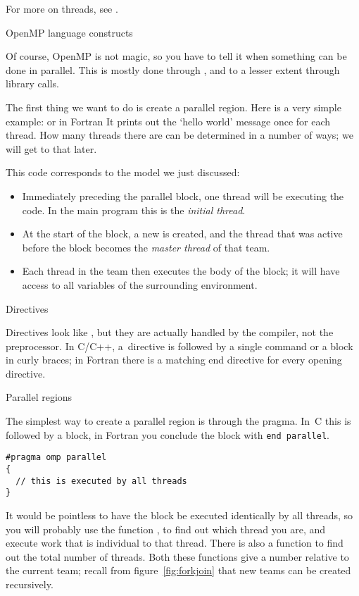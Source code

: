 For more on threads, see .

 {OpenMP language constructs}

Of course, OpenMP is not magic, so you have to tell it when something
can be done in parallel. This is mostly done through ,
and to a lesser extent through library calls.

The first thing we want to do is create a parallel region.
Here is a very simple example:
or in Fortran
It prints out the `hello world' message once for each thread. How many
threads there are can be determined in a number of ways; we will get to that later.

This code corresponds to the model we just discussed:
\begin{itemize}
\item Immediately preceding the parallel block, one thread will be
  executing the code. In the main program this is the \emph{initial
    thread}.
\item At the start of the block, a new  is
  created, and the thread that was active before the block
  becomes the \emph{master thread} of that team.
\item Each thread in the team then executes the body of the block; it
  will have access to all variables of the surrounding environment.
\end{itemize}

 {Directives}

Directives look like , but they
are actually handled by the compiler, not the preprocessor.
In C/C++, a~directive is followed by a single command or a block
in curly braces; in Fortran there is a matching end directive
for every opening directive.

 {Parallel regions}

The simplest way to create a parallel region is through the 
 pragma. In~C this is followed by a block,
in Fortran you conclude the block with \texttt{end parallel}.
\begin{verbatim}
#pragma omp parallel
{
  // this is executed by all threads
}
\end{verbatim}
It would be pointless to have the block be executed identically by
all threads, so you will probably use the function
, to find out which thread you are,
and execute work that is individual to that thread.
There is also a function
 to find out the total number of threads.
Both these functions give a number relative to the current team;
recall from figure~\ref{fig:forkjoin} that new teams can be created recursively.

